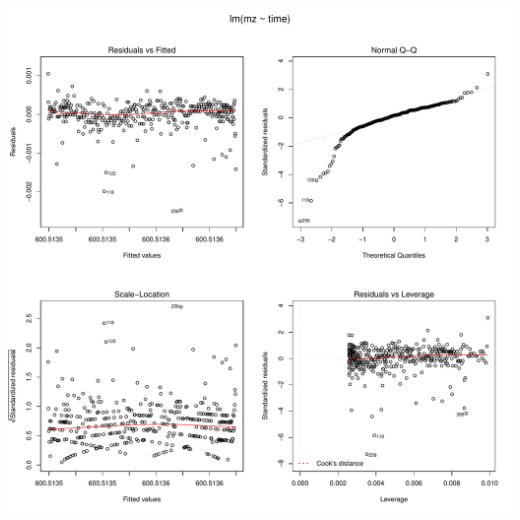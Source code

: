 \documentclass[]{article}
\begin{document}
\includegraphics{Supplementary_document_files/figure-latex/fit.lin.600-1.pdf}
\end{document}
